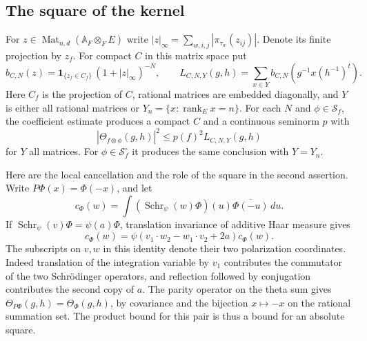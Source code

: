 \subsection{The square of the kernel}

For \(z\in\operatorname{Mat}_{n,d}(\mathbb A_F\otimes_F E)\)
write \(|z|_\infty=\sum_{w,i,j}|\pi_{\tau_w}(z_{ij})|\). Denote its
finite projection by \(z_f\). For compact \(C\) in this matrix space put
\[
 b_{C,N}(z)=\mathbf 1_{\{z_f\in C_f\}}\,(1+|z|_\infty)^{-N},
 \qquad
 L_{C,N,Y}(g,h)=\sum_{x\in Y} b_{C,N}(g^{-1}x(h^{-1})^t).
\]
Here \(C_f\) is the projection of \(C\), rational matrices are
embedded diagonally, and \(Y\) is either all rational matrices or
\(Y_n=\{x:\operatorname{rank}_E x=n\}\).
For each \(N\) and \(\phi\in\mathcal S_f\), the coefficient estimate produces
a compact \(C\) and a continuous seminorm \(p\) with
\begin{equation}
 |\Theta_{f\otimes\phi}(g,h)|^2\le p(f)^2 L_{C,N,Y}(g,h)
 \label{eq:theta-lattice-majorant}
\end{equation}
for \(Y\) all matrices. For \(\phi\in\mathcal S_f^\circ\) it produces
the same conclusion with \(Y=Y_n\).

Here are the local cancellation and the role of the square in the
second assertion. Write \(P\Phi(x)=\Phi(-x)\), and let
\[
 c_\Phi(w)=\int(\operatorname{Schr}_\psi(w)\Phi)(u)
                    \overline{\Phi(-u)}\,du .
\]
If \(\operatorname{Schr}_\psi(v)\Phi=\psi(a)\Phi\), translation
invariance of additive Haar measure gives
\[
 c_\Phi(w)=\psi(v_1\cdot w_2-w_1\cdot v_2+2a)c_\Phi(w).
\]
The subscripts on \(v,w\) in this identity denote their two
polarization coordinates. Indeed translation of the integration
variable by \(v_1\) contributes the commutator of the two Schr\"odinger
operators, and reflection followed by conjugation contributes the
second copy of \(a\). The parity operator on the theta sum gives
\(\Theta_{P\Phi}(g,h)=\Theta_\Phi(g,h)\), by covariance and the
bijection \(x\mapsto-x\) on the rational summation set. The product
bound for this pair is thus a bound for an absolute square.

